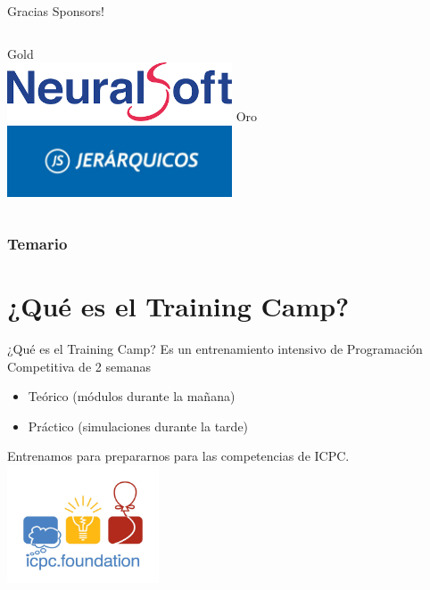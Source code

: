 \documentclass{beamer}
\begin{document}

\begin{frame}{Gracias Sponsors!}
    \begin{columns}[t]
        \centering
        Gold\\
        \includegraphics[width=0.5\textwidth,keepaspectratio]{logos/neuralsoft.png}
        \centering
        Oro\\
        \includegraphics[width=0.5\textwidth,keepaspectratio]{logos/jerarquicos.jpg}
    \end{columns}
\end{frame}


\begin{frame}
\frametitle{Temario}
\tableofcontents
\end{frame}


\section{¿Qué es el Training Camp?}

\begin{frame}{¿Qué es el Training Camp?}
Es un entrenamiento intensivo de Programación Competitiva de 2 semanas
\begin{itemize}
    \item Teórico (módulos durante la mañana) 
    \item Práctico (simulaciones durante la tarde)
\end{itemize}
Entrenamos para prepararnos para las competencias de ICPC.
    \centering
    \includegraphics[clip,height=3.5cm,keepaspectratio]{logos/icpc.jpeg}
\end{frame}
\end{document}
